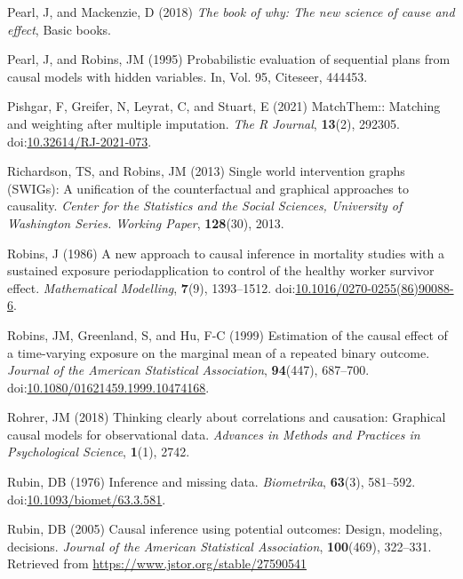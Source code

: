 \documentclass[
  singlecolumn]{article}
\newlength{\cslhangindent}
\newlength{\cslentryspacingunit} %
\newenvironment{CSLReferences}[2] %
 {%
  \setlength{\parindent}{0pt}
  \ifodd #1
  \let\oldpar\par
  \def\par{\hangindent=\cslhangindent\oldpar}
  \fi
  \setlength{\parskip}{#2\cslentryspacingunit}
 }%
 {}
\begin{document}
\begin{CSLReferences}{1}{0}
\leavevmode{}%
Pearl, J, and Mackenzie, D (2018) \emph{The book of why: The new science
of cause and effect}, Basic books.

\leavevmode{}%
Pearl, J, and Robins, JM (1995) Probabilistic evaluation of sequential
plans from causal models with hidden variables. In, Vol. 95, Citeseer,
444453.

\leavevmode{}%
Pishgar, F, Greifer, N, Leyrat, C, and Stuart, E (2021) MatchThem::
Matching and weighting after multiple imputation. \emph{The R Journal},
\textbf{13}(2), 292305.
doi:\href{https://doi.org/10.32614/RJ-2021-073}{10.32614/RJ-2021-073}.

\leavevmode{}%
Richardson, TS, and Robins, JM (2013) Single world intervention graphs
(SWIGs): A unification of the counterfactual and graphical approaches to
causality. \emph{Center for the Statistics and the Social Sciences,
University of Washington Series. Working Paper}, \textbf{128}(30), 2013.

\leavevmode{}%
Robins, J (1986) A new approach to causal inference in mortality studies
with a sustained exposure period{\textemdash}application to control of
the healthy worker survivor effect. \emph{Mathematical Modelling},
\textbf{7}(9), 1393--1512.
doi:\href{https://doi.org/10.1016/0270-0255(86)90088-6}{10.1016/0270-0255(86)90088-6}.

\leavevmode{}%
Robins, JM, Greenland, S, and Hu, F-C (1999) Estimation of the causal
effect of a time-varying exposure on the marginal mean of a repeated
binary outcome. \emph{Journal of the American Statistical Association},
\textbf{94}(447), 687--700.
doi:\href{https://doi.org/10.1080/01621459.1999.10474168}{10.1080/01621459.1999.10474168}.

\leavevmode{}%
Rohrer, JM (2018) Thinking clearly about correlations and causation:
Graphical causal models for observational data. \emph{Advances in
Methods and Practices in Psychological Science}, \textbf{1}(1), 2742.

\leavevmode{}%
Rubin, DB (1976) Inference and missing data. \emph{Biometrika},
\textbf{63}(3), 581--592.
doi:\href{https://doi.org/10.1093/biomet/63.3.581}{10.1093/biomet/63.3.581}.

\leavevmode{}%
Rubin, DB (2005) Causal inference using potential outcomes: Design,
modeling, decisions. \emph{Journal of the American Statistical
Association}, \textbf{100}(469), 322--331. Retrieved from
\url{https://www.jstor.org/stable/27590541}


\end{CSLReferences}
\end{document}
